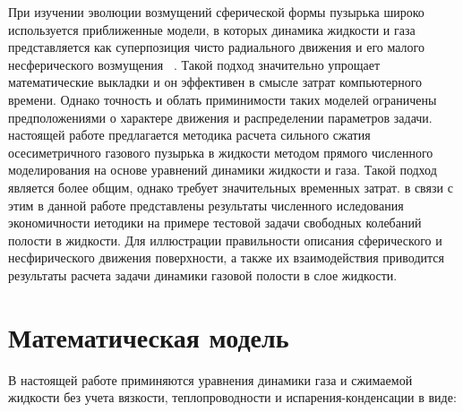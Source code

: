 \documentclass{article}
\begin{document}
При изучении эволюции возмущений сферической формы пузырька широко используется приближенные модели, в которых динамика жидкости и газа представляется как суперпозиция чисто радиального движения и его малого несферического возмущения ~\cite{litlink1}. Такой подход значительно упрощает математические выкладки и он эффективен в смысле затрат компьютерного времени. Однако точность и облать приминимости таких моделей ограничены предположениями о характере движения и распределении параметров задачи. \newline{} настоящей работе предлагается методика расчета сильного сжатия осесиметричного газового пузырька в жидкости методом прямого численного моделирования на основе уравнений динамики жидкости и газа. \newline\newline Такой подход является более общим, однако требует значительных временных затрат. в связи с этим в данной работе представлены результаты численного иследования экономичности иетодики на примере тестовой задачи свободных колебаний полости в жидкости. Для иллюстрации правильности описания сферического и несфирического движения поверхности, а также их взаимодействия приводится результаты расчета задачи динамики газовой полости в слое жидкости.
\newline
\section{Математическая модель}
В настоящей работе приминяются уравнения динамики газа и сжимаемой жидкости без учета вязкости, теплопроводности и испарения-конденсации в виде:
\begin{center}
\end{center}

\begin{center}
\end{center}

\begin{center}
\end{center}

\begin{center}
\end{center}
\end{document}
